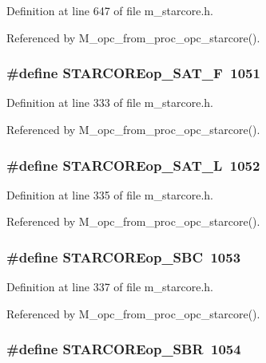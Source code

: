 Definition at line 647 of file m\_\-starcore.h.

Referenced by M\_\-opc\_\-from\_\-proc\_\-opc\_\-starcore().
\subsubsection{\setlength{\rightskip}{0pt plus 5cm}\#define STARCOREop\_\-SAT\_\-F~1051}\label{m__starcore_8h_06253e87bc86c27e306d05823e8153b4}




Definition at line 333 of file m\_\-starcore.h.

Referenced by M\_\-opc\_\-from\_\-proc\_\-opc\_\-starcore().
\subsubsection{\setlength{\rightskip}{0pt plus 5cm}\#define STARCOREop\_\-SAT\_\-L~1052}\label{m__starcore_8h_cbed70e06493a34e02561dde1a047063}




Definition at line 335 of file m\_\-starcore.h.

Referenced by M\_\-opc\_\-from\_\-proc\_\-opc\_\-starcore().
\subsubsection{\setlength{\rightskip}{0pt plus 5cm}\#define STARCOREop\_\-SBC~1053}\label{m__starcore_8h_9985e36f4be76893c779d9034cf458f6}




Definition at line 337 of file m\_\-starcore.h.

Referenced by M\_\-opc\_\-from\_\-proc\_\-opc\_\-starcore().
\subsubsection{\setlength{\rightskip}{0pt plus 5cm}\#define STARCOREop\_\-SBR~1054}\label{m__starcore_8h_56e5e451dcb12fe8f9590212ed03a8d9}




